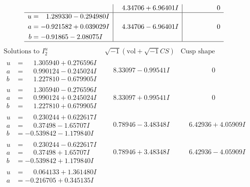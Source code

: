 \documentclass[1p]{elsarticle_modified}
\theoremstyle{definition}
\newcommand{\I}{\sqrt{-1}}
\begin{document}
$$\begin{array}{c|c|c}
 & \phantom{-}4.34706 + 6.96401 I & \phantom{-0.000000 } 0 \\ \hline\begin{aligned}
u &= \phantom{-}1.289330 - 0.294980 I \\
a &= -0.921582 + 0.039029 I \\
b &= -0.91865 - 2.08075 I\end{aligned}
 & \phantom{-}4.34706 - 6.96401 I & \phantom{-0.000000 } 0\\
 \hline 
 \end{array}$$\newpage$$\begin{array}{c|c|c}  
\text{Solutions to }I^u_{2}& \I (\text{vol} + \sqrt{-1}CS) & \text{Cusp shape}\\
 \hline 
\begin{aligned}
u &= \phantom{-}1.305940 + 0.276596 I \\
a &= \phantom{-}0.990124 - 0.245024 I \\
b &= \phantom{-}1.227810 - 0.679905 I\end{aligned}
 & \phantom{-}8.33097 - 0.99541 I & \phantom{-0.000000 } 0 \\ \hline\begin{aligned}
u &= \phantom{-}1.305940 - 0.276596 I \\
a &= \phantom{-}0.990124 + 0.245024 I \\
b &= \phantom{-}1.227810 + 0.679905 I\end{aligned}
 & \phantom{-}8.33097 + 0.99541 I & \phantom{-0.000000 } 0 \\ \hline\begin{aligned}
u &= \phantom{-}0.230244 + 0.622617 I \\
a &= \phantom{-}0.37498 - 1.65707 I \\
b &= -0.539842 - 1.179840 I\end{aligned}
 & \phantom{-}0.78946 - 3.48348 I & \phantom{-}6.42936 + 4.05909 I \\ \hline\begin{aligned}
u &= \phantom{-}0.230244 - 0.622617 I \\
a &= \phantom{-}0.37498 + 1.65707 I \\
b &= -0.539842 + 1.179840 I\end{aligned}
 & \phantom{-}0.78946 + 3.48348 I & \phantom{-}6.42936 - 4.05909 I \\ \hline\begin{aligned}
u &= \phantom{-}0.064133 + 1.361480 I \\
a &= -0.216705 + 0.345135 I \\

\end{aligned}
\end{array}$$
\end{document}

